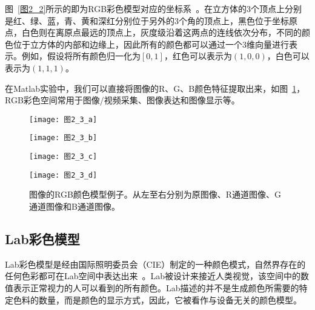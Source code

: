 图~\ref{图2_2}所示的即为RGB彩色模型对应的坐标系~\cite{ZhangZheng2010book}。在立方体的3个顶点上分别是红、绿、蓝，青、黄和深红分别位于另外的3个角的顶点上，黑色位于坐标原点，白色则在离原点最远的顶点上，灰度级沿着这两点的连线依次分布，不同的颜色位于立方体的内部和边缘上，因此所有的颜色都可以通过一个3维向量进行表示。例如，假设将所有颜色归一化为$[0,1]$，红色可以表示为$(1,0,0)$，白色可以表示为$(1,1,1)$。

在Matlab实验中，我们可以直接将图像的R、G、B颜色特征提取出来，如图~\ref{图2_3}，RGB彩色空间常用于图像/视频采集、图像表达和图像显示等。

\begin{figure}[b]
\begin{minipage}{0.24\textwidth}
  \centering
  \texttt{[image: 图2\_3\_a]}
  \label{图2_3_a}
\end{minipage}\hfill
\begin{minipage}{0.24\textwidth}
  \centering
  \texttt{[image: 图2\_3\_b]}
  \label{图2_3_b}
\end{minipage}
\begin{minipage}{0.24\textwidth}
  \centering
  \texttt{[image: 图2\_3\_c]}
  \label{图2_3_c}
\end{minipage}
\begin{minipage}{0.24\textwidth}
  \centering
  \texttt{[image: 图2\_3\_d]}
  \label{图2_3_d}
\end{minipage}
  \caption{图像的RGB颜色模型例子。从左至右分别为原图像、R通道图像、G通道图像和B通道图像。}
  \label{图2_3} 
\end{figure}

\subsection{Lab彩色模型}
\label{2_1_2}

Lab彩色模型是经由国际照明委员会（CIE）制定的一种颜色模式，自然界存在的任何色彩都可在Lab空间中表达出来~\cite{ZhangZheng2010book}。Lab被设计来接近人类视觉，该空间中的数值表示正常视力的人可以看到的所有颜色。Lab描述的并不是生成颜色所需要的特定色料的数量，而是颜色的显示方式，因此，它被看作与设备无关的颜色模型。

